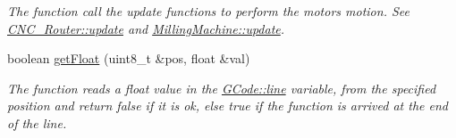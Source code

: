 \begin{DoxyCompactItemize}
\begin{DoxyCompactList}\small\item\em The function call the update functions to perform the motors motion. See \hyperlink{class_c_n_c___router_a3a8982d9582e2144d38791626b3060e6}{C\+N\+C\+\_\+\+Router\+::update} and \hyperlink{class_milling_machine_ac74c527eb504eb6f13d80fb64487c874}{Milling\+Machine\+::update}. \end{DoxyCompactList}\item 
boolean \hyperlink{class_g_code_abd9c3a13cf8f2958d8d9f0a563855e7b}{get\+Float} (uint8\+\_\+t \&pos, float \&val)
\begin{DoxyCompactList}\small\item\em The function reads a float value in the \hyperlink{class_g_code_a20d7c90740e9e139b24f68336ad8c8f1}{G\+Code\+::line} variable, from the specified position and return false if it is ok, else true if the function is arrived at the end of the line. \end{DoxyCompactList}\end{DoxyCompactItemize}
